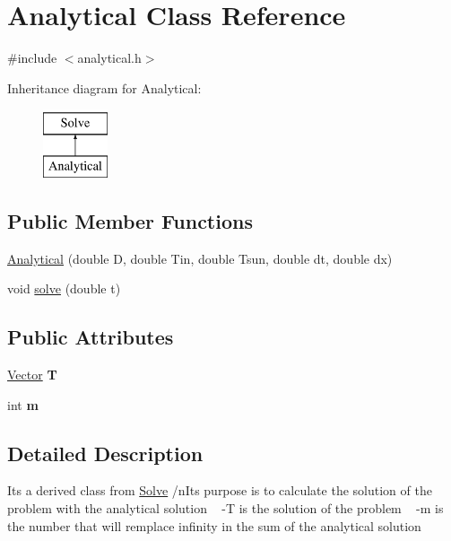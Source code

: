 \hypertarget{class_analytical}{}\section{Analytical Class Reference}
\label{class_analytical}


{\ttfamily \#include $<$analytical.\+h$>$}

Inheritance diagram for Analytical\+:\begin{figure}[H]
\begin{center}
\leavevmode
\includegraphics[height=2.000000cm]{class_analytical}
\end{center}
\end{figure}
\subsection*{Public Member Functions}
\begin{DoxyCompactItemize}
\item 
\hyperlink{class_analytical_a5a2be7809dfe198c5d6bdc5b6448f75b}{Analytical} (double D, double Tin, double Tsun, double dt, double dx)
\item 
void \hyperlink{class_analytical_a8fe1d5769bb516115a31719222eb9ae5}{solve} (double t)
\end{DoxyCompactItemize}
\subsection*{Public Attributes}
\begin{DoxyCompactItemize}
\item 
\mbox{\label{class_analytical_abee1da12ac56489506088600823328eb}} 
\hyperlink{class_vector}{Vector} {\bfseries T}
\item 
\mbox{\label{class_analytical_a3a6b8bb5c9985bdfba024ecc378fef14}} 
int {\bfseries m}
\end{DoxyCompactItemize}


\subsection{Detailed Description}
It\textquotesingle{}s a derived class from \hyperlink{class_solve}{Solve} /n\+It\textquotesingle{}s purpose is to calculate the solution of the problem with the analytical solution ~\newline
-\/T is the solution of the problem ~\newline
-\/m is the number that will remplace infinity in the sum of the analytical solution

